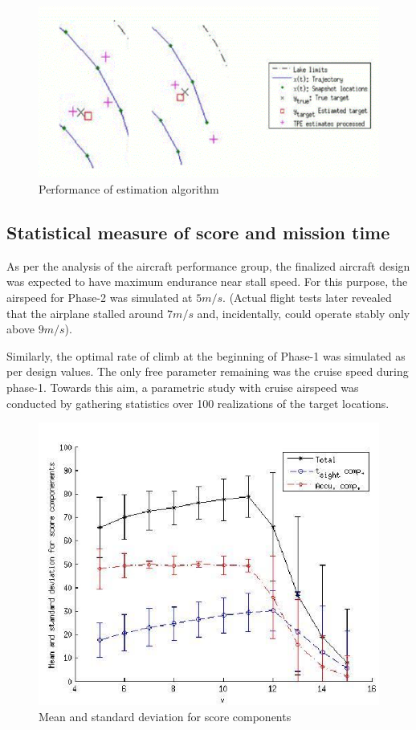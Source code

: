 \begin{figure}
\centering
\includegraphics[scale=0.75]{Figures/mission_tpea_d}
\caption{Performance of estimation algorithm}
\label{fig_mission_tpea_d}
\end{figure}

\subsection{Statistical measure of score and mission time}

As per the analysis of the aircraft performance group, the finalized aircraft design was expected to have maximum endurance near stall speed. For this purpose, the airspeed for Phase-2 was simulated at $5m/s$. (Actual flight tests later revealed that the airplane stalled around $7m/s$ and, incidentally, could operate stably only above $9m/s$). 

Similarly, the optimal rate of climb at the beginning of Phase-1 was simulated as per design values. The only free parameter remaining was the cruise speed during phase-1. Towards this aim, a parametric study with cruise airspeed was conducted by gathering statistics over 100 realizations of the target locations.

\begin{figure}
\centering
\includegraphics[scale=0.75]{Figures/mission_stats_a}
\caption{Mean and standard deviation for score components}
\label{fig_mission_stats_a}
\end{figure}

